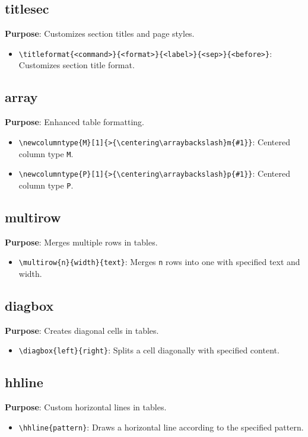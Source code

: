 \documentclass[12pt,twoside]{report}
\begin{document}
\subsection{titlesec}
\textbf{Purpose}: Customizes section titles and page styles.
\begin{itemize}
    \item \verb|\titleformat{<command>}{<format>}{<label>}{<sep>}{<before>}|: Customizes section title format.
\end{itemize}

\subsection{array}
\textbf{Purpose}: Enhanced table formatting.
\begin{itemize}
    \item \verb|\newcolumntype{M}[1]{>{\centering\arraybackslash}m{#1}}|: Centered column type \texttt{M}.
    \item \verb|\newcolumntype{P}[1]{>{\centering\arraybackslash}p{#1}}|: Centered column type \texttt{P}.
\end{itemize}

\subsection{multirow}
\textbf{Purpose}: Merges multiple rows in tables.
\begin{itemize}
    \item \verb|\multirow{n}{width}{text}|: Merges \texttt{n} rows into one with specified text and width.
\end{itemize}

\subsection{diagbox}
\textbf{Purpose}: Creates diagonal cells in tables.
\begin{itemize}
    \item \verb|\diagbox{left}{right}|: Splits a cell diagonally with specified content.
\end{itemize}

\subsection{hhline}
\textbf{Purpose}: Custom horizontal lines in tables.
\begin{itemize}
    \item \verb|\hhline{pattern}|: Draws a horizontal line according to the specified pattern.
\end{itemize}
\end{document}
